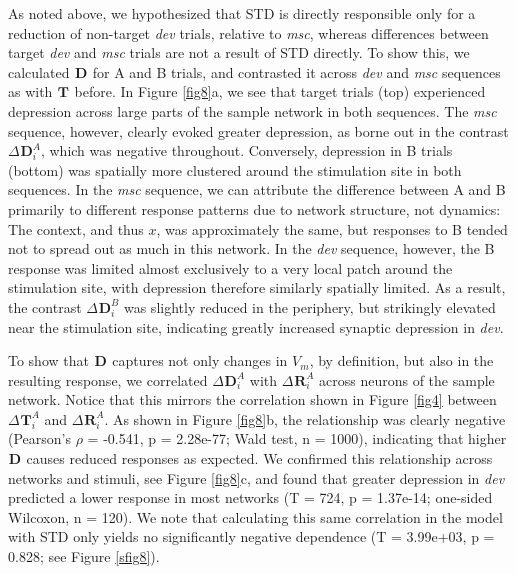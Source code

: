 \documentclass[pdflatex,referee,iicol,sn-basic]{sn-jnl}
\newcommand{\dev}{\textit{dev}}
\newcommand{\msc}{\textit{msc}}
\renewcommand{\R}[3][]{{}^{#1}_{}\!\mathbf{R}^{#2}_{#3}}
\renewcommand{\T}[3][]{{}^{#1}_{}\mathbf{T}^{#2}_{#3}}
\newcommand{\D}[3][]{{}^{#1}_{}\!\mathbf{D}^{#2}_{#3}}
\theoremstyle{thmstyleone}%
\theoremstyle{thmstyletwo}%
\theoremstyle{thmstylethree}%
\begin{document}
As noted above, we hypothesized that STD is directly responsible only for a reduction of non-target \dev{} trials, relative to \msc{}, whereas differences between target \dev{} and \msc{} trials are not a result of STD directly. To show this, we calculated $\D{}{}$ for A and B trials, and contrasted it across \dev{} and \msc{} sequences as with $\T{}{}$ before.
In Figure \ref{fig8}a, we see that target trials (top) experienced depression across large parts of the sample network in both sequences. The \msc{} sequence, however, clearly evoked greater depression, as borne out in the contrast $\Delta \D{A}{i}$, which was negative throughout. Conversely, depression in B trials (bottom) was spatially more clustered around the stimulation site in both sequences. In the \msc{} sequence, we can attribute the difference between A and B primarily to different response patterns due to network structure, not dynamics: The context, and thus $x$, was approximately the same, but responses to B tended not to spread out as much in this network. In the \dev{} sequence, however, the B response was limited almost exclusively to a very local patch around the stimulation site, with depression therefore similarly spatially limited. As a result, the contrast $\Delta \D{B}{i}$ was slightly reduced in the periphery, but strikingly elevated near the stimulation site, indicating greatly increased synaptic depression in \dev{}.

To show that $\D{}{}$ captures not only changes in $V_m$, by definition, but also in the resulting response, we correlated $\Delta \D{A}{i}$ with $\Delta \R{A}{i}$ across neurons of the sample network. Notice that this mirrors the correlation shown in Figure \ref{fig4} between $\Delta \T{A}{i}$ and $\Delta \R{A}{i}$. As shown in Figure \ref{fig8}b, the relationship was clearly negative (Pearson's $\rho$ = -0.541, p = 2.28e-77; Wald test, n = 1000), indicating that higher $\D{}{}$ causes reduced responses as expected. We confirmed this relationship across networks and stimuli, see Figure \ref{fig8}c, and found that greater depression in \dev{} predicted a lower response in most networks (T = 724, p = 1.37e-14; one-sided Wilcoxon, n = 120). We note that calculating this same correlation in the model with STD only yields no significantly negative dependence (T = 3.99e+03, p = 0.828; see Figure \ref{sfig8}).
\end{document}
